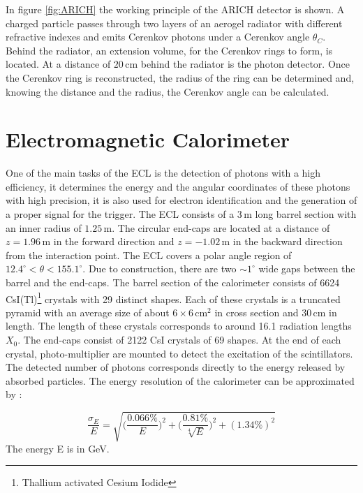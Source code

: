\documentclass[a4paper,11pt,twosided,final,german,openbib,pdftex,listof=totoc,bibliography=totoc]{scrbook}
\begin{document}
In figure \ref{fig:ARICH} the working principle of the ARICH detector is shown. A charged particle passes through two layers of an aerogel radiator with different refractive indexes and emits Cerenkov photons under a Cerenkov angle $\theta_C$. Behind the radiator, an extension volume, for the Cerenkov rings to form, is located. At a distance of $20\,\textrm{cm}$ behind the radiator is the photon detector.\cite{B2TR} Once the Cerenkov ring is reconstructed, the radius of the ring can be determined and, knowing the distance and the radius, the Cerenkov angle can be calculated.

\section{Electromagnetic Calorimeter}
\label{sec:ECL}

One of the main tasks of the ECL is the detection of photons with a high efficiency, it determines the energy and the angular coordinates of these photons with high precision, it is also used for electron identification and the generation of a proper signal for the trigger. The ECL consists of a $3\,\textrm{m}$ long barrel section with an inner radius of $1.25\,\textrm{m}$. The circular end-caps are located at a distance of $z=1.96\,\textrm{m}$ in the forward direction and $z=-1.02\,\textrm{m}$ in the backward direction from the interaction point. The ECL covers a polar angle region of $12.4^{\circ} < \theta < 155.1^{\circ}$. Due to construction, there are two $ \sim 1^{\circ}$ wide gaps between the barrel and the end-caps. The barrel section of the calorimeter consists of 6624 CsI(Tl)\footnote{Thallium activated Cesium Iodide} crystals with 29 distinct shapes. Each of these crystals is a truncated pyramid with an average size of about $6\times6 \, \textrm{cm}^2$ in cross section and $30\,\textrm{cm}$ in length. The length of these crystals corresponds to around 16.1 radiation lengths $X_0$. The end-caps consist of 2122 CsI crystals of 69 shapes. At the end of each crystal, photo-multiplier are mounted to detect the excitation of the scintillators. The detected number of photons corresponds directly to the energy released by absorbed particles.
The energy resolution of the calorimeter can be approximated by \cite{B2TR} \cite{Belle_ECL_2015}:

\begin{equation}
\frac{\sigma_E}{E} = \sqrt{\bigg(\frac{0.066\%}{E}\bigg)^2 + \bigg(\frac{0.81\%}{\sqrt[4]{E}}\bigg)^2 + (1.34\%)^2}
\end{equation}
The energy E is in GeV.
\newline
\end{document}
